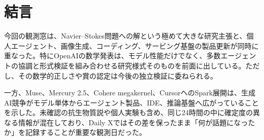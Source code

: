\section{結言}
今回の観測窓は、Navier--Stokes問題への解という極めて大きな研究主張と、個人エージェント、画像生成、コーディング、サービング基盤の製品更新が同時に重なった。特にOpenAIの数学発表は、モデル性能だけでなく、多数エージェントの協調と形式検証を組み合わせる研究様式そのものを前面に出している。ただし、その数学的正しさや賞の認定は今後の独立検証に委ねられる。

一方、Muse、Mercury 2.5、Cohere megakernel、CursorへのSpark展開は、生成AI競争がモデル単体からエージェント製品、IDE、推論基盤へ広がっていることを示した。未確認の抗生物質説や個人実験も含め、同じ24時間の中に確定度の異なる情報が混在しており、Daily Xではその差を保ったまま「何が話題になったか」を記録することが重要な観測日だった。
